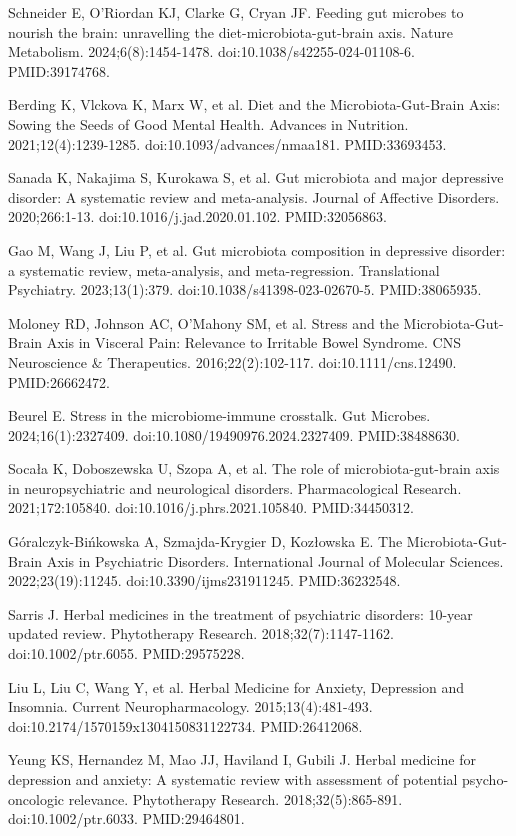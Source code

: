 \documentclass[12pt,oneside]{book}
\newcommand{\reff}[2]{\par\hangindent=7mm\hangafter=1\noindent[#1]\hspace{2mm}#2\par}
\begin{document}
\reff{30}{Schneider E, O'Riordan KJ, Clarke G, Cryan JF. Feeding gut microbes to nourish the brain: unravelling the diet-microbiota-gut-brain axis. Nature Metabolism. 2024;6(8):1454-1478. doi:10.1038/s42255-024-01108-6. PMID:39174768.}

\reff{31}{Berding K, Vlckova K, Marx W, et al. Diet and the Microbiota-Gut-Brain Axis: Sowing the Seeds of Good Mental Health. Advances in Nutrition. 2021;12(4):1239-1285. doi:10.1093/advances/nmaa181. PMID:33693453.}

\reff{32}{Sanada K, Nakajima S, Kurokawa S, et al. Gut microbiota and major depressive disorder: A systematic review and meta-analysis. Journal of Affective Disorders. 2020;266:1-13. doi:10.1016/j.jad.2020.01.102. PMID:32056863.}

\reff{33}{Gao M, Wang J, Liu P, et al. Gut microbiota composition in depressive disorder: a systematic review, meta-analysis, and meta-regression. Translational Psychiatry. 2023;13(1):379. doi:10.1038/s41398-023-02670-5. PMID:38065935.}

\reff{34}{Moloney RD, Johnson AC, O'Mahony SM, et al. Stress and the Microbiota-Gut-Brain Axis in Visceral Pain: Relevance to Irritable Bowel Syndrome. CNS Neuroscience \& Therapeutics. 2016;22(2):102-117. doi:10.1111/cns.12490. PMID:26662472.}

\reff{35}{Beurel E. Stress in the microbiome-immune crosstalk. Gut Microbes. 2024;16(1):2327409. doi:10.1080/19490976.2024.2327409. PMID:38488630.}

\reff{36}{Socała K, Doboszewska U, Szopa A, et al. The role of microbiota-gut-brain axis in neuropsychiatric and neurological disorders. Pharmacological Research. 2021;172:105840. doi:10.1016/j.phrs.2021.105840. PMID:34450312.}

\reff{37}{Góralczyk-Bińkowska A, Szmajda-Krygier D, Kozłowska E. The Microbiota-Gut-Brain Axis in Psychiatric Disorders. International Journal of Molecular Sciences. 2022;23(19):11245. doi:10.3390/ijms231911245. PMID:36232548.}

\reff{38}{Sarris J. Herbal medicines in the treatment of psychiatric disorders: 10-year updated review. Phytotherapy Research. 2018;32(7):1147-1162. doi:10.1002/ptr.6055. PMID:29575228.}

\reff{39}{Liu L, Liu C, Wang Y, et al. Herbal Medicine for Anxiety, Depression and Insomnia. Current Neuropharmacology. 2015;13(4):481-493. doi:10.2174/1570159x1304150831122734. PMID:26412068.}

\reff{40}{Yeung KS, Hernandez M, Mao JJ, Haviland I, Gubili J. Herbal medicine for depression and anxiety: A systematic review with assessment of potential psycho-oncologic relevance. Phytotherapy Research. 2018;32(5):865-891. doi:10.1002/ptr.6033. PMID:29464801.}
\end{document}
